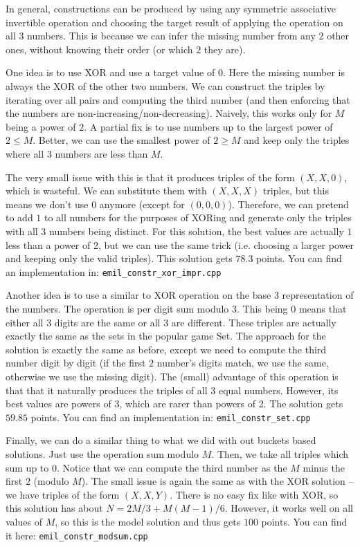 \documentclass{article}
\begin{document}
In general, constructions can be produced by using any symmetric associative invertible operation and choosing the target result of applying the operation on all $3$ numbers. This is because we can infer the missing number from any 2 other ones, without knowing their order (or which $2$ they are).

One idea is to use XOR and use a target value of $0$. Here the missing number is always the XOR of the other two numbers. We can construct the triples by iterating over all pairs and computing the third number (and then enforcing that the numbers are non-increasing/non-decreasing). Naively, this works only for $M$ being a power of $2$. A partial fix is to use numbers up to the largest power of $2 \leq M$. Better, we can use the smallest power of $2 \geq M$ and keep only the triples where all $3$ numbers are less than $M$.

The very small issue with this is that it produces triples of the form $(X, X, 0)$, which is wasteful. We can substitute them with $(X, X, X)$ triples, but this means we don't use $0$ anymore (except for $(0, 0, 0)$). Therefore, we can pretend to add $1$ to all numbers for the purposes of XORing and generate only the triples with all $3$ numbers being distinct. For this solution, the best values are actually $1$ less than a power of 2, but we can use the same trick (i.e. choosing a larger power and keeping only the valid triples). This solution gets $78.3$ points. You can find an implementation in: \verb|emil_constr_xor_impr.cpp|

Another idea is to use a similar to XOR operation on the base $3$ representation of the numbers. The operation is per digit sum modulo $3$. This being 0 means that either all $3$ digits are the same or all $3$ are different. These triples are actually exactly the same as the sets in the popular game Set. The approach for the solution is exactly the same as before, except we need to compute the third number digit by digit (if the first $2$ number's digits match, we use the same, otherwise we use the missing digit). The (small) advantage of this operation is that that it naturally produces the triples of all $3$ equal numbers. However, its best values are powers of $3$, which are rarer than powers of 2. The solution gets $59.85$ points. You can find an implementation in: \verb|emil_constr_set.cpp|

Finally, we can do a similar thing to what we did with out buckets based solutions. Just use the operation sum modulo $M$. Then, we take all triples which sum up to $0$. Notice that we can compute the third number as the $M$ minus the first $2$ (modulo $M$). The small issue is again the same as with the XOR solution -- we have triples of the form $(X, X, Y)$. There is no easy fix like with XOR, so this solution has about $N = 2M / 3 + M (M - 1) / 6$. However, it works well on all values of $M$, so this is the model solution and thus gets $100$ points. You can find it here: \verb|emil_constr_modsum.cpp|
\end{document}
